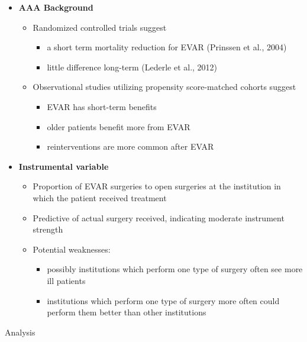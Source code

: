 \documentclass[final,plain]{beamer}
\newlength{\onecolwid}
\newlength{\twocolwid}
\newcommand{\bi}{\begin{itemize}}
\newcommand{\ei}{\end{itemize}}
\newcommand{\bluebold}{\color{dblue} \bf}
\newcommand{\colsevenvsep}{\vspace{37mm}}
\newcommand{\hilit}{\color{mypurple}}
\begin{document}
\begin{frame}[t]
\begin{columns}[t]
\begin{column}{\twocolwid}
\begin{columns}[t]
\begin{column}{\onecolwid}

      \vspace{10mm} %

        \begin{exampleblock}{} \rmfamily %
	   \bi
	      \item {\bluebold \large  AAA Background}
	          \vspace{8pt}
	         \bi \itemsep14pt
	         \item Randomized controlled trials suggest 
			\bi
				\item a short term mortality reduction for EVAR (Prinssen et al., 2004) 
				\item little difference long-term (Lederle et al., 2012)
			\ei
	         \item Observational studies utilizing propensity score-matched cohorts \citep{schermerhorn08} suggest
			\bi
				\item EVAR has short-term benefits
				\item older patients benefit more from EVAR
				\item reinterventions are more common after EVAR 
			\ei
	         \ei

		\vspace{24pt}
	      \item {\bluebold \large Instrumental variable}
	          \vspace{8pt}
	         \bi \itemsep14pt
	         \item Proportion of EVAR surgeries to open surgeries at the institution in which the patient received treatment
	         \item Predictive of actual surgery received, indicating moderate instrument strength
	         \item {\hilit Potential weaknesses:} 
			\bi
				\item possibly institutions which perform one type of surgery often see more ill patients
				\item institutions which perform one type of surgery more often could perform them better than other institutions
			\ei
	         \ei
 	     \ei
        \end{exampleblock}


    \colsevenvsep %

    \begin{exampleblock}{\Large Analysis}


\end{exampleblock}
\end{column}
\end{columns}
\end{column}
\end{columns}
\end{frame}
\end{document}
